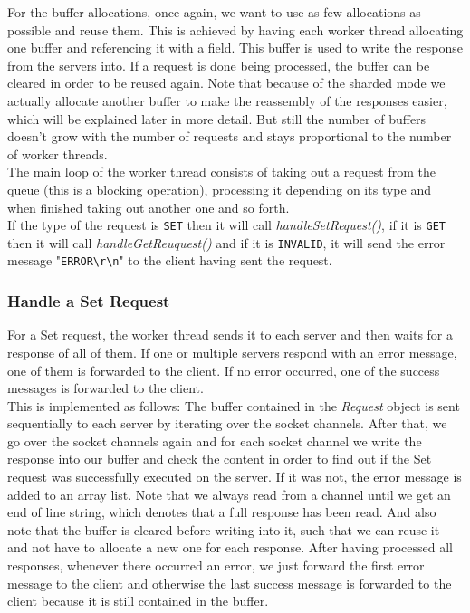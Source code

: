 For the buffer allocations, once again, we want to use as few allocations as possible and reuse them. This is achieved by having each worker thread allocating one buffer and referencing it with a field. This buffer is used to write the response from the servers into. If a request is done being processed, the buffer can be cleared in order to be reused again. Note that because of the sharded mode we actually allocate another buffer to make the reassembly of the responses easier, which will be explained later in more detail. But still the number of buffers doesn't grow with the number of requests and stays proportional to the number of worker threads.\\

The main loop of the worker thread consists of taking out a request from the queue (this is a blocking operation), processing it depending on its type and when finished taking out another one and so forth. \\
If the type of the request is \texttt{SET} then it will call \textit{handleSetRequest()}, if it is \texttt{GET} then it will call \textit{handleGetReuquest()} and if it is \texttt{INVALID}, it will send the error message "\texttt{ERROR}\texttt{\textbackslash r\textbackslash n}" to the client having sent the request.

\subsubsection{Handle a Set Request}
For a Set request, the worker thread sends it to each server and then waits for a response of all of them. If one or multiple servers respond with an error message, one of them is forwarded to the client. If no error occurred, one of the success messages is forwarded to the client. \\
This is implemented as follows: The buffer contained in the \textit{Request} object is sent sequentially to each server by iterating over the socket channels. After that, we go over the socket channels again and for each socket channel we write the response into our buffer and check the content in order to find out if the Set request was successfully executed on the server. If it was not, the error message is added to an array list. Note that we always read from a channel until we get an end of line string, which denotes that a full response has been read. And also note that the buffer is cleared before writing into it, such that we can reuse it and not have to allocate a new one for each response. After having processed all responses, whenever there occurred an error, we just forward the first error message to the client and otherwise the last success message is forwarded to the client because it is still contained in the buffer. 

